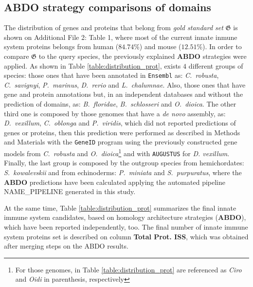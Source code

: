 \documentclass[11pt]{article}
\newcommand{\TODO}[1]{\begingroup\color{red}#1\endgroup}
\begin{document}
\subsection*{\textbf{ABDO} strategy comparisons of domains} \label{subODB}

The distribution of genes and proteins that belong from \textsl{gold standard set} 
$\boldsymbol{\mathfrak{G}}$ is shown on Additional File 2: Table 1, where most 
of the current innate inmune system proteins belongs from human ($84.74$\%) and 
mouse ($12.51$\%). In order to compare $\boldsymbol{\mathfrak{G}}$ to the query 
species, the previously explained \textbf{ABDO} strategies were applied. As 
shown in Table \ref{table:distribution_prot}, exists $4$ different groups of 
species: those ones that have been annotated in \texttt{Ensembl} as: 
\textit{C.\ robusta}, \textit{C.\ savignyi}, \textit{P.\ marinus}, \textit{D.\ 
rerio} and \textit{L.\ chalumnae}. Also, those ones that have gene and 
protein annotations but, in an independent databases and without the prediction 
of domains, as: \textit{B.\ floridae}, \textit{B.\ schlosseri} and \textit{O.\ 
dioica}. The other third one is composed by those genomes that have a \textsl{de 
novo} assembly, as: \textit{D.\ vexillum}, \textit{C.\ oblonga} and 
\textit{P.\ viridis}, which did not reported predictions of genes or 
proteins, then this prediction were performed as described in Methods and 
Materials with the \texttt{GeneID} program using the previously constructed 
gene models from \textit{C.\ robusta} and \textit{O.\ dioica}\footnote{For 
those genomes, in Table \ref{table:distribution_prot} are referenced as 
\textsl{Ciro} and \textsl{Oidi} in parenthesis, respectively} and with 
\texttt{AUGUSTUS} for \textit{D. vexillum}. Finally, the last group is composed 
by the outgroup species from hemichordates: \textit{S.\ kowalevskii} and from 
echinoderms: \textit{P.\ miniata} and \textit{S.\ purpuratus}, where the 
\textbf{ABDO} predictions have been calculated applying the automated 
pipeline \TODO{NAME\_PIPELINE} generated in this study.

At the same time, Table \ref{table:distribution_prot} summarizes the final 
innate immune system candidates, based on homology architecture strategies 
(\textbf{ABDO}), which have been reported independently, too. The final number 
of innate immune system proteins set is described on column \textbf{Total Prot. 
ISS}, which was obtained after merging steps on the ABDO results. 
\end{document}
